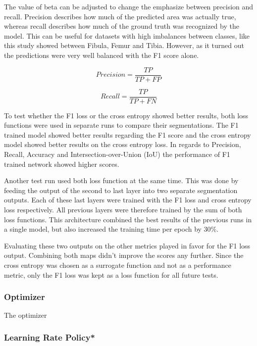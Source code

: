 The value of beta can be adjusted to change the emphasize between precision and recall. Precision describes how much of the predicted area was actually true, whereas recall describes how much of the ground truth was recognized by the model. This can be useful for datasets with high imbalances between classes, like this study showed between Fibula, Femur and Tibia. However, as it turned out the predictions were very well balanced with the F1 score alone.

\begin{equation}
Precision = \frac{TP}{TP+FP}
\end{equation}

\begin{equation}
Recall = \frac{TP}{TP+FN}
\end{equation}

To test whether the F1 loss or the cross entropy showed better results, both loss functions were used in separate runs to compare their segmentations. The F1 trained model showed better results regarding the F1 score and the cross entropy model showed better results on the cross entropy loss. In regards to Precision, Recall, Accuracy and Intersection-over-Union (IoU) the performance of F1 trained network showed higher scores.

Another test run used both loss function at the same time. This was done by feeding the output of the second to last layer into two separate segmentation outputs. Each of these last layers were trained with the F1 loss and cross entropy loss respectively. All previous layers were therefore trained by the sum of both loss functions. This architecture combined the best results of the previous runs in a single model, but also increased the training time per epoch by 30\%.

Evaluating these two outputs on the other metrics played in favor for the F1 loss output. Combining both maps didn't improve the scores any further. Since the cross entropy was chosen as a surrogate function and not as a performance metric, only the F1 loss was kept as a loss function for all future tests.

\subsubsection{Optimizer}

The optimizer 

\subsubsection{Learning Rate Policy*}

